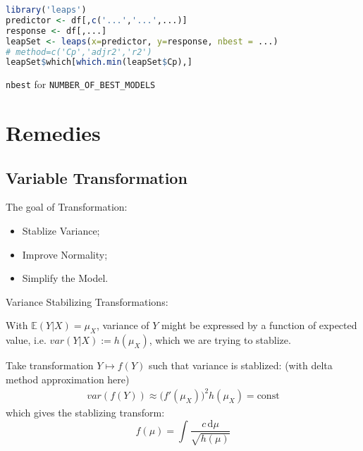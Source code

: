 \begin{rcode}
\begin{lstlisting}[language=R]
library('leaps')
predictor <- df[,c('...','...',...)]
response <- df[,...]
leapSet <- leaps(x=predictor, y=response, nbest = ...)
# method=c('Cp','adjr2','r2')
leapSet$which[which.min(leapSet$Cp),]
\end{lstlisting}
    
    \lstinline|nbest| for \lstinline|NUMBER_OF_BEST_MODELS|
\end{rcode}





















\section{Remedies}

\subsection{Variable Transformation}\label{SubSubSectionVarianceStablizeTransformation}
    The goal of Transformation:
        
        \begin{itemize}[topsep=2pt,itemsep=2pt]
            \item Stablize Variance;
            \item Improve Normality;
            \item Simplify the Model.
        \end{itemize}
    
    \begin{point}
        Variance Stabilizing Transformations:
    \end{point}

                With $ \mathbb{E}(Y|X)=\mu_X$, variance of $ Y $ might be expressed by a function of expected value, i.e. $ var(Y|X):=h(\mu_X) $, which we are trying to stablize.
                
                Take transformation $Y\mapsto f(Y) $ such that variance is stablized: (with delta method approximation here)
                \begin{align*}
                    var(f(Y))\approx \bigl(f'(\mu _X)\bigr)^2h(\mu _X)=\mathrm{const}
                \end{align*}
                which gives the stablizing transform:
                \begin{equation}
                    f(\mu)=\int\dfrac{c\,\mathrm{d}\mu}{\sqrt{h(\mu)}} 
                \end{equation}
    
